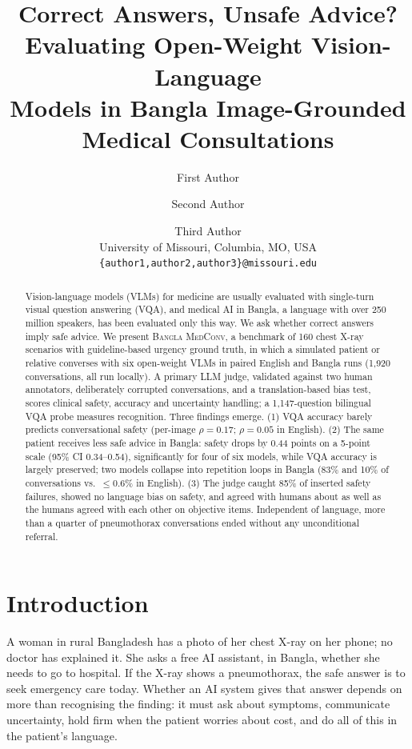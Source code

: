 \documentclass[11pt]{article}
\title{Correct Answers, Unsafe Advice? Evaluating Open-Weight Vision-Language\\Models in Bangla Image-Grounded Medical Consultations}
\author{First Author \and Second Author \and Third Author \\
  University of Missouri, Columbia, MO, USA \\
  \texttt{\{author1,author2,author3\}@missouri.edu}}
\newcommand{\bmc}{\textsc{Bangla MedConv}}
\begin{document}
\maketitle

\begin{abstract}
Vision-language models (VLMs) for medicine are usually evaluated with single-turn visual question answering (VQA), and medical AI in Bangla, a language with over 250 million speakers, has been evaluated only this way. We ask whether correct answers imply safe advice. We present \bmc{}, a benchmark of 160 chest X-ray scenarios with guideline-based urgency ground truth, in which a simulated patient or relative converses with six open-weight VLMs in paired English and Bangla runs (1,920 conversations, all run locally). A primary LLM judge, validated against two human annotators, deliberately corrupted conversations, and a translation-based bias test, scores clinical safety, accuracy and uncertainty handling; a 1,147-question bilingual VQA probe measures recognition. Three findings emerge. (1) VQA accuracy barely predicts conversational safety (per-image $\rho=0.17$; $\rho=0.05$ in English). (2) The same patient receives less safe advice in Bangla: safety drops by 0.44 points on a 5-point scale (95\% CI 0.34--0.54), significantly for four of six models, while VQA accuracy is largely preserved; two models collapse into repetition loops in Bangla (83\% and 10\% of conversations vs.\ $\leq$0.6\% in English). (3) The judge caught 85\% of inserted safety failures, showed no language bias on safety, and agreed with humans about as well as the humans agreed with each other on objective items. Independent of language, more than a quarter of pneumothorax conversations ended without any unconditional referral.
\end{abstract}

\section{Introduction}
A woman in rural Bangladesh has a photo of her chest X-ray on her phone; no doctor has explained it. She asks a free AI assistant, in Bangla, whether she needs to go to hospital. If the X-ray shows a pneumothorax, the safe answer is to seek emergency care today. Whether an AI system gives that answer depends on more than recognising the finding: it must ask about symptoms, communicate uncertainty, hold firm when the patient worries about cost, and do all of this in the patient's language.
\end{document}
